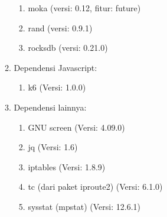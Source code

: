\begin{enumerate}
\begin{enumerate}
\begin{enumerate}
        \item moka (versi: 0.12, fitur: future)
        \item rand (versi: 0.9.1)
        \item rocksdb (versi: 0.21.0)
      \end{enumerate}
      \item Dependensi Javascript:
      \begin{enumerate}
        \item k6 (Versi: 1.0.0)
      \end{enumerate}
      \item Dependensi lainnya:
      \begin{enumerate}
        \item GNU screen (Versi: 4.09.0)
        \item jq (Versi: 1.6)
        \item iptables (Versi: 1.8.9)
        \item tc (dari paket iproute2) (Versi: 6.1.0)
        \item sysstat (mpstat) (Versi: 12.6.1)
      \end{enumerate}
    \end{enumerate}
\end{enumerate}